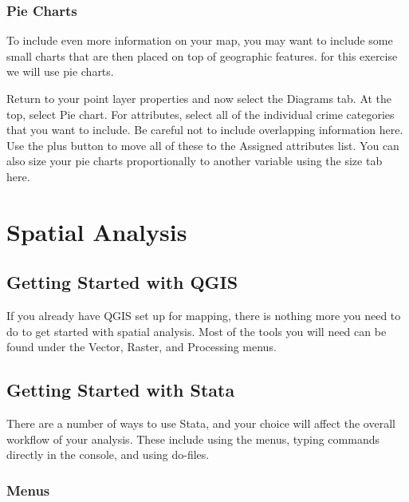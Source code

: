 \documentclass[]{book}
\begin{document}
\hypertarget{pie-charts}{%
\section{Pie Charts}\label{pie-charts}}

To include even more information on your map, you may want to include some small charts that are then placed on top of geographic features. for this exercise we will use pie charts.

Return to your point layer properties and now select the Diagrams tab. At the top, select Pie chart. For attributes, select all of the individual crime categories that you want to include. Be careful not to include overlapping information here. Use the plus button to move all of these to the Assigned attributes list. You can also size your pie charts proportionally to another variable using the size tab here.

\hypertarget{part-spatial-analysis}{%
\part{Spatial Analysis}\label{part-spatial-analysis}}

\hypertarget{getting-started-with-qgis-1}{%
\chapter{Getting Started with QGIS}\label{getting-started-with-qgis-1}}

If you already have QGIS set up for mapping, there is nothing more you need to do to get started with spatial analysis. Most of the tools you will need can be found under the Vector, Raster, and Processing menus.

\hypertarget{getting-started-with-stata}{%
\chapter{Getting Started with Stata}\label{getting-started-with-stata}}

There are a number of ways to use Stata, and your choice will affect the overall workflow of your analysis. These include using the menus, typing commands directly in the console, and using do-files.

\hypertarget{menus}{%
\section{Menus}\label{menus}}
\end{document}
